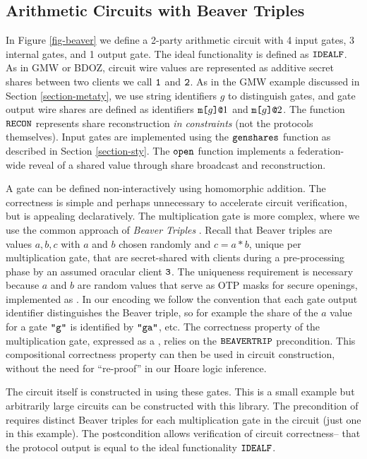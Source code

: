\subsection{Arithmetic Circuits with Beaver Triples}
\label{section-beaver}



In Figure \ref{fig-beaver} we define a 2-party arithmetic circuit with
4 input gates, 3 internal gates, and 1 output gate. The ideal functionality
is defined as $\texttt{IDEALF}$. As in GMW or BDOZ, circuit wire values
are represented as additive secret shares between two clients we call
$\texttt{1}$ and $\texttt{2}$. As in the GMW example discussed in Section
\ref{section-metaty}, we use string identifiers $g$ to distinguish
gates, and gate output wire shares are defined as identifiers
$\texttt{m[}g\texttt{]}\texttt{@}1$ and $\texttt{m[}g\texttt{]}\texttt{@}2$. The function $\texttt{RECON}$
represents share reconstruction \emph{in constraints} (not the
protocols themselves). Input gates are
implemented using the $\texttt{genshares}$ function as described in
Section \ref{section-sty}. The $\texttt{open}$ function
implements a federation-wide reveal of a shared value through
share broadcast and reconstruction.

A  gate can be defined non-interactively using 
homomorphic addition. The correctness  is simple
and perhaps unnecessary to accelerate circuit verification, but is
appealing declaratively.  The multiplication gate  is more
complex, where we use the common approach of \emph{Beaver Triples}
\cite{evans2018pragmatic}. Recall that Beaver triples are values
$a,b,c$ with $a$ and $b$ chosen randomly and $c = a * b$, unique per
multiplication gate, that are secret-shared with clients during a
pre-processing phase by an assumed oracular client $\texttt{3}$.
The uniqueness requirement is necessary because
$a$ and $b$ are random values that serve as OTP masks for secure
openings, implemented as . In our encoding we follow the
convention that each gate output identifier distinguishes the Beaver
triple, so for example the share of the $a$ value for a gate
$\texttt{"g"}$ is identified by $\texttt{"ga"}$, etc. The correctness
property of the multiplication gate, expressed as a
, relies on the $\texttt{BEAVERTRIP}$
precondition. This compositional correctness property can then be used
in circuit construction, without the need for ``re-proof'' in our
Hoare logic inference.


The circuit itself is constructed in  using these
gates. This is a small example but arbitrarily large circuits can be
constructed with this library. The precondition of  requires
distinct Beaver triples for each multiplication gate in the circuit
(just one in this example). The postcondition allows verification of
circuit correctness-- that the protocol output is equal to the ideal
functionality $\texttt{IDEALF}$.

